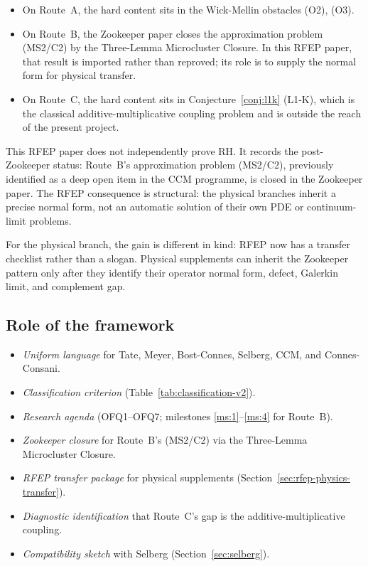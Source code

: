 \documentclass[11pt,a4paper]{article}
\theoremstyle{plain}
\theoremstyle{definition}
\begin{document}
\begin{itemize}[leftmargin=*]
\item On Route~A, the hard content sits in the Wick-Mellin obstacles
  (O2), (O3).
\item On Route~B, the Zookeeper paper closes the approximation
  problem (MS2/C2) by the Three-Lemma Microcluster Closure.  In this
  RFEP paper, that result is imported rather than reproved; its role
  is to supply the normal form for physical transfer.
\item On Route~C, the hard content sits in Conjecture~\ref{conj:l1k}
  (L1-K), which is the classical additive-multiplicative coupling
  problem and is outside the reach of the present project.
\end{itemize}

This RFEP paper does not independently prove RH.  It records the
post-Zookeeper status: Route~B's approximation problem (MS2/C2),
previously identified as a deep open item in the CCM programme, is
closed in the Zookeeper paper.  The RFEP consequence is structural:
the physical branches inherit a precise normal form, not an automatic
solution of their own PDE or continuum-limit problems.

For the physical branch, the gain is different in kind: RFEP now has
a transfer checklist rather than a slogan.  Physical supplements can
inherit the Zookeeper pattern only after they identify their operator
normal form, defect, Galerkin limit, and complement gap.

\subsection{Role of the framework}

\begin{itemize}
\item \emph{Uniform language} for Tate, Meyer, Bost-Connes, Selberg,
  CCM, and Connes-Consani.
\item \emph{Classification criterion}
  (Table~\ref{tab:classification-v2}).
\item \emph{Research agenda} (OFQ1--OFQ7; milestones
  \ref{ms:1}--\ref{ms:4} for Route~B).
\item \emph{Zookeeper closure} for Route~B's (MS2/C2) via the
  Three-Lemma Microcluster Closure.
\item \emph{RFEP transfer package} for physical supplements
  (Section~\ref{sec:rfep-physics-transfer}).
\item \emph{Diagnostic identification} that Route~C's gap is the
  additive-multiplicative coupling.
\item \emph{Compatibility sketch} with Selberg
  (Section~\ref{sec:selberg}).
\end{itemize}
\end{document}
